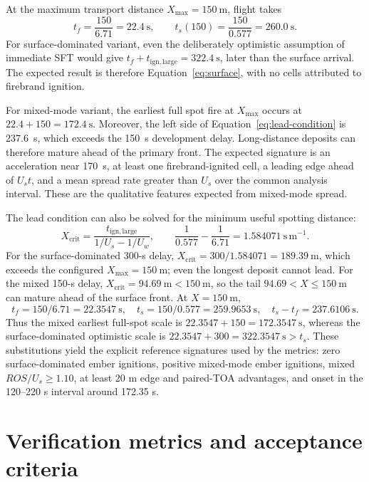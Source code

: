 At the maximum transport distance $X_{\max}=\SI{150}{\metre}$, flight takes
\[
 t_f=\frac{150}{6.71}=\SI{22.4}{\second},
 \qquad
 t_s(150)=\frac{150}{0.577}=\SI{260.0}{\second}.
\]
For surface-dominated variant, even the deliberately optimistic assumption of immediate SFT
would give $t_f+t_{\mathrm{ign,large}}=\SI{322.4}{\second}$, later than the
surface arrival. The expected result is therefore Equation~\ref{eq:surface},
with no cells attributed to firebrand ignition.

For mixed-mode variant, the earliest full spot fire at $X_{\max}$ occurs at
$22.4+150=\SI{172.4}{\second}$. Moreover, the left side of
Equation~\ref{eq:lead-condition} is \SI{237.6}{\second}, which exceeds the
\SI{150}{\second} development delay. Long-distance deposits can therefore
mature ahead of the primary front. The expected signature is an acceleration
near \SI{170}{\second}, at least one firebrand-ignited cell, a leading edge
ahead of $U_s t$, and a mean spread rate greater than $U_s$ over the common
analysis interval. These are the qualitative features expected from mixed-mode spread.

The lead condition can also be solved for the minimum useful spotting
distance:
\[
 X_{\mathrm{crit}}=
 \frac{t_{\mathrm{ign,large}}}{1/U_s-1/U_w},\qquad
 \frac{1}{0.577}-\frac{1}{6.71}=1.584071~\mathrm{s\,m^{-1}}.
\]
For the surface-dominated 300-s delay,
\(X_{\mathrm{crit}}=300/1.584071=189.39~\mathrm{m}\), which exceeds the
configured \(X_{\max}=150~\mathrm{m}\); even the longest deposit cannot lead.
For the mixed 150-s delay,
\(X_{\mathrm{crit}}=94.69~\mathrm{m}<150~\mathrm{m}\), so the tail
\(94.69<X\leq150~\mathrm{m}\) can mature ahead of the surface front.
At \(X=150~\mathrm{m}\),
\[
 t_f=150/6.71=22.3547~\mathrm{s},\quad
 t_s=150/0.577=259.9653~\mathrm{s},\quad
 t_s-t_f=237.6106~\mathrm{s}.
\]
Thus the mixed earliest full-spot scale is
\(22.3547+150=172.3547~\mathrm{s}\), whereas the
surface-dominated optimistic scale is
\(22.3547+300=322.3547~\mathrm{s}>t_s\).
These substitutions yield the explicit reference signatures used by the
metrics: zero surface-dominated ember ignitions, positive mixed-mode ember
ignitions, mixed \(ROS/U_s\geq1.10\), at least 20 m edge and paired-TOA
advantages, and onset in the 120--220 s interval around 172.35 s.

\section{Verification metrics and acceptance criteria}


